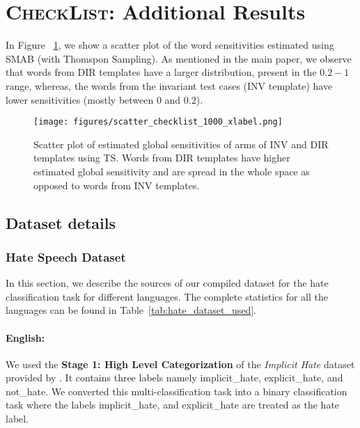 \section{\textsc{CheckList}: Additional Results}

In Figure ~\ref{fig:scatter_plot}, we show a scatter plot of the word sensitivities estimated using SMAB (with Thomspon Sampling). As mentioned in the main paper, we observe that words from DIR templates have a larger distribution, present in the $0.2-1$ range, whereas, the words from the invariant test cases (INV template) have lower sensitivities (mostly between $0$ and $0.2$).

\begin{figure}[!t]
\centering
    \texttt{[image: figures/scatter\_checklist\_1000\_xlabel.png]}
    \caption{Scatter plot of estimated global sensitivities of arms of INV and DIR templates using TS. Words from DIR templates have higher estimated global sensitivity and are spread in the whole space as opposed to words from INV templates. %
    } 
    \label{fig:scatter_plot}
\end{figure}


\subsection{Dataset details}
\label{sec:Appendix:subsection:dataset details}

\subsubsection{Hate Speech Dataset}
\label{sec:appendix:subsection:hate_speech_details}
In this section, we describe the sources of our compiled dataset for the hate classification task for different languages. The complete statistics for all the languages can be found in Table~\ref{tab:hate_dataset_used}.

\paragraph{English:} We used the \textbf{Stage 1: High Level Categorization} of the \textit{Implicit Hate} dataset provided by \cite{elsherief-etal-2021-latent}. It contains three labels namely implicit\_hate, explicit\_hate, and not\_hate. We converted this multi-classification task into a binary classification task where the labels implicit\_hate, and explicit\_hate are treated as the hate label.
